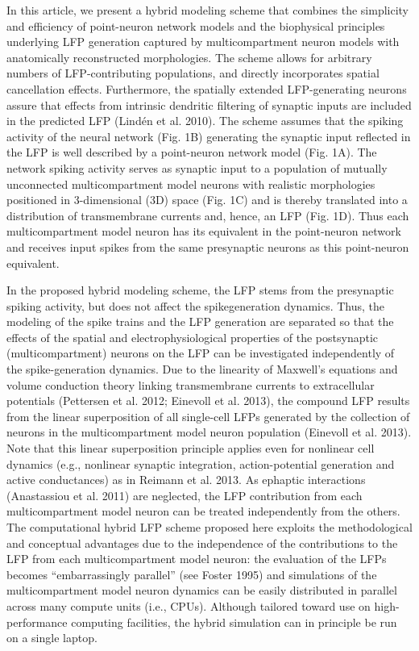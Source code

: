 In this article, we present a hybrid modeling scheme that
combines the simplicity and efficiency of point-neuron network
models and the biophysical principles underlying LFP generation captured by multicompartment neuron models with anatomically reconstructed morphologies. The scheme allows for
arbitrary numbers of LFP-contributing populations, and directly
incorporates spatial cancellation effects. Furthermore, the spatially extended LFP-generating neurons assure that effects from
intrinsic dendritic filtering of synaptic inputs are included in
the predicted LFP (Lindén et al. 2010). The scheme assumes
that the spiking activity of the neural network (Fig. 1B) generating the synaptic input reflected in the LFP is well described by a
point-neuron network model (Fig. 1A). The network spiking
activity serves as synaptic input to a population of mutually
unconnected multicompartment model neurons with realistic
morphologies positioned in 3-dimensional (3D) space (Fig. 1C)
and is thereby translated into a distribution of transmembrane
currents and, hence, an LFP (Fig. 1D). Thus each multicompartment model neuron has its equivalent in the point-neuron network and receives input spikes from the same presynaptic
neurons as this point-neuron equivalent.

In the proposed hybrid modeling scheme, the LFP stems from
the presynaptic spiking activity, but does not affect the spikegeneration dynamics. Thus, the modeling of the spike trains and
the LFP generation are separated so that the effects of the spatial
and electrophysiological properties of the postsynaptic (multicompartment) neurons on the LFP can be investigated independently of the spike-generation dynamics. Due to the linearity of
Maxwell’s equations and volume conduction theory linking
transmembrane currents to extracellular potentials (Pettersen
et al. 2012; Einevoll et al. 2013), the compound LFP results from
the linear superposition of all single-cell LFPs generated by the
collection of neurons in the multicompartment model neuron population (Einevoll et al. 2013). Note that this linear superposition principle applies even for nonlinear cell dynamics (e.g.,
nonlinear synaptic integration, action-potential generation and
active conductances) as in Reimann et al. 2013. As ephaptic
interactions (Anastassiou et al. 2011) are neglected, the LFP contribution from each multicompartment model neuron can be
treated independently from the others. The computational
hybrid LFP scheme proposed here exploits the methodological
and conceptual advantages due to the independence of the contributions to the LFP from each multicompartment model neuron: the evaluation of the LFPs becomes “embarrassingly
parallel” (see Foster 1995) and simulations of the multicompartment model neuron dynamics can be easily distributed in parallel across many compute units (i.e., CPUs). Although tailored
toward use on high-performance computing facilities, the hybrid
simulation can in principle be run on a single laptop.


